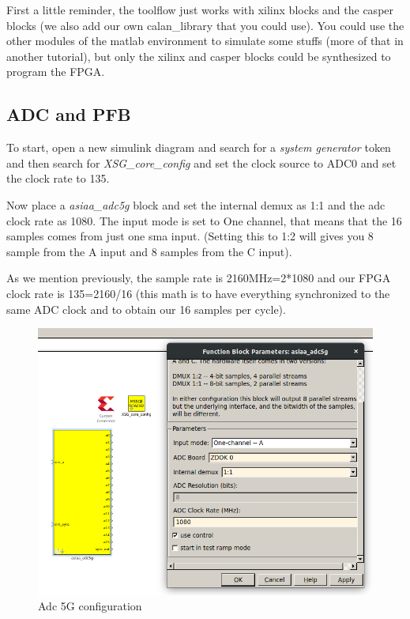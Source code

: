 First a little reminder, the toolflow just works with xilinx blocks and the casper blocks (we also add our own calan\_library that you could use). You could use the other modules of the matlab environment to simulate some stuffs (more of that in another tutorial), but only the xilinx and casper blocks could be synthesized to program the FPGA. 

\subsection{ADC and PFB}

To start, open a new simulink diagram and search for a \textit{system generator} token and then search for
\textit{XSG\_core\_config} and set the clock source to ADC0 and set the clock rate to 135.

Now place a \textit{asiaa\_adc5g} block and set the internal demux as 1:1 and the adc clock rate as 1080.  The input mode is set to One channel, that means that the 16 samples comes from just one sma input. (Setting this to 1:2 will gives you 8 sample from the A input and 8 samples from the C input).

As we mention previously, the sample rate is 2160MHz=2*1080 and our FPGA clock rate is 135=2160/16 (this math is to have everything synchronized to the same ADC clock and to obtain our 16 samples per cycle).

\begin{figure}
    \centering
    \includegraphics[scale=0.4]{images/asiaa_config.png}
    \caption{Adc 5G configuration}
    \label{fig:asiaa_config}
\end{figure}

